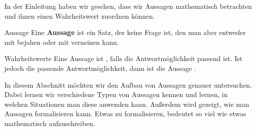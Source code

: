 \documentclass[../../main.tex]{subfiles}
\begin{document}
\newcommand{\statementIcon}[3]{
    \begin{tikzpicture}[onbase]
        \node at (0,0) {\texttt{[image: \#1]}};
        \ifthenelse{\equal{#3}{}}{}{
            \draw[line width=2mm,red,opacity=0.6] (-.5,-.5) -- (.5,.5);
            \draw[line width=2mm,red,opacity=0.6] (.5,-.5) -- (-.5,.5);
        }
    \end{tikzpicture}
}
\def\poisonIcn{\statementIcon{images/poison.png}{0.86}{}}
\def\superPwrIcn{\statementIcon{images/super_power.png}{0.86}{}}
\def\superPwrIcnVarI{\statementIcon{images/super_power_index1.png}{0.86}{}}
\def\superPwrIcnVarII{\statementIcon{images/super_power_index2.png}{0.86}{}}
\def\drinkIcn{\statementIcon{images/trinken_TEMP.png}{0.86}{}}
\def\burgerIcn{\statementIcon{images/burger.png}{1.53}{}}
\def\saladIcn{\statementIcon{images/salat.png}{1.39}{}}
\def\friesIcn{\statementIcon{images/pommes.png}{0.86}{}}

In der Einleitung haben wir gesehen, dass wir Aussagen mathematisch betrachten und ihnen einen
Wahrheitswert zuordnen können.

\begin{definition}{Aussage}
    Eine \textbf{Aussage} ist ein Satz, der keine Frage ist, den man aber entweder mit 
     bejahen oder mit  
    verneinen kann.
\end{definition}

\begin{definition}{Wahrheitswerte}
    Eine Aussage ist \wahr, falls die Antwortmöglichkeit 
    passend ist. Ist jedoch  die passende
    Antwortmöglichkeit, dann ist die Aussage \falsch.
\end{definition}

In diesem Abschnitt möchten wir den Aufbau von Aussagen genauer untersuchen. 
Dabei lernen wir verschiedene Typen von Aussagen kennen und lernen, 
in welchen Situationen man diese anwenden kann. Außerdem wird gezeigt, 
wie man Aussagen formalisieren kann. Etwas zu formalisieren, bedeutet so 
viel wie etwas mathematisch aufzuschreiben.
\end{document}
